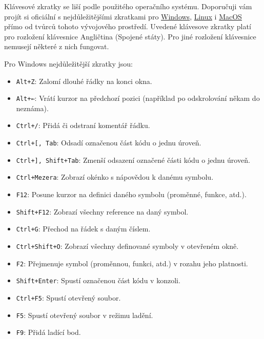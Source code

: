 \documentclass[a4paper,11pt,twoside]{article}
\def\code#1{\textnormal{\texttt{#1}}}
\theoremstyle{red}
\theoremstyle{green}
\begin{document}
    Klávesové zkratky se liší podle použitého operačního systému.
    Doporučuji vám projít si oficiální  s nejdůležitějšími zkratkami pro
    \href{https://code.visualstudio.com/shortcuts/keyboard-shortcuts-windows.pdf}{Windows}, 
    \href{https://code.visualstudio.com/shortcuts/keyboard-shortcuts-linux.pdf}{Linux} i 
    \href{https://code.visualstudio.com/shortcuts/keyboard-shortcuts-macos.pdf}{MacOS} 
    přímo od tvůrců tohoto vývojového prostředí.
    Uvedené klávesove zkratky platí pro rozložení klávesnice Angličtina (Spojené státy).
    Pro jiné rozložení klávesnice nemusejí některé z nich fungovat.

    Pro Windows nejdůležitější zkratky jsou:
    \begin{itemize}
        \item \code{Alt+Z}: Zalomí dlouhé řádky na konci okna.
        \item \code{Alt+←}: Vrátí kurzor na předchozí pozici (například po odskrolování někam do neznáma).
        \item \code{Ctrl+/}: Přidá či odstraní komentář řádku.
        \item \code{Ctrl+[, Tab}: Odsadí označenou část kódu o jednu úroveň.
        \item \code{Ctrl+], Shift+Tab}: Zmenší odsazení označené části kódu o jednu úroveň.
        \item \code{Ctrl+Mezera}: Zobrazí okénko s nápovědou k danému symbolu.
        \item \code{F12}: Posune kurzor na definici daného symbolu (proměnné, funkce, atd.).
        \item \code{Shift+F12}: Zobrazí všechny reference na daný symbol.
        \item \code{Ctrl+G}: Přechod na řádek s daným číslem.
        \item \code{Ctrl+Shift+O}: Zobrazí všechny definované symboly v otevřeném okně.
        \item \code{F2}: Přejmenuje symbol (proměnnou, funkci, atd.) v rozahu jeho platnosti.
        \item \code{Shift+Enter}: Spustí označenou část kódu v konzoli.
        \item \code{Ctrl+F5}: Spustí otevřený soubor.
        \item \code{F5}: Spustí otevřený soubor v režimu ladění.
        \item \code{F9}: Přidá ladící bod.
    \end{itemize}
\end{document}
